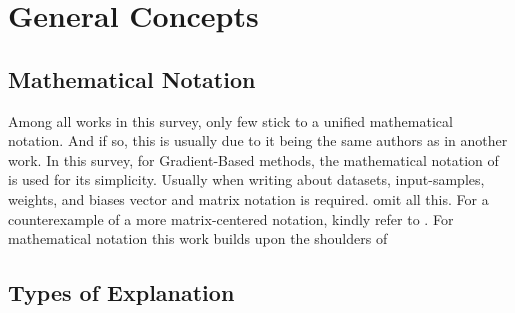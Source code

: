 \section{General Concepts}

\subsection{Mathematical Notation}
Among all works in this survey, only few stick to a unified mathematical notation. And if so, this is usually due to it being the same authors as in another work. In this survey, for Gradient-Based methods, the mathematical notation of  is used for its simplicity. Usually when writing about datasets, input-samples, weights, and biases vector and matrix notation is required.  omit all this. For a counterexample of a more matrix-centered notation, kindly refer to .
For mathematical notation this work builds upon the shoulders of~\cite{Kindermans.2018}

\subsection{Types of Explanation}




